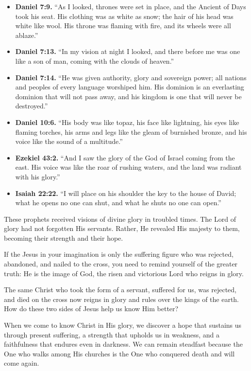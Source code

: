 \begin{itemize}
    \item \textbf{Daniel 7:9.} ``As I looked, thrones were set in place, and the Ancient of Days took his seat. His clothing was as white as snow; the hair of his head was white like wool. His throne was flaming with fire, and its wheels were all ablaze.''  

    \item \textbf{Daniel 7:13.} ``In my vision at night I looked, and there before me was one like a son of man, coming with the clouds of heaven.''  

    \item \textbf{Daniel 7:14.} ``He was given authority, glory and sovereign power; all nations and peoples of every language worshiped him. His dominion is an everlasting dominion that will not pass away, and his kingdom is one that will never be destroyed.''  

    \item \textbf{Daniel 10:6.} ``His body was like topaz, his face like lightning, his eyes like flaming torches, his arms and legs like the gleam of burnished bronze, and his voice like the sound of a multitude.''  

    \item \textbf{Ezekiel 43:2.} ``And I saw the glory of the God of Israel coming from the east. His voice was like the roar of rushing waters, and the land was radiant with his glory.''  

    \item \textbf{Isaiah 22:22.} ``I will place on his shoulder the key to the house of David; what he opens no one can shut, and what he shuts no one can open.''  
\end{itemize}

These prophets received visions of divine glory in troubled times. The Lord of glory had not forgotten His servants. Rather, He revealed His majesty to them, becoming their strength and their hope.

If the Jesus in your imagination is only the suffering figure who was rejected, abandoned, and nailed to the cross, you need to remind yourself of the greater truth: He is the image of God, the risen and victorious Lord who reigns in glory.

\begin{ReaderQuestion}
The same Christ who took the form of a servant, suffered for us, was rejected, and died on the cross now reigns in glory and rules over the kings of the earth. How do these two sides of Jesus help us know Him better?
\end{ReaderQuestion}

When we come to know Christ in His glory, we discover a hope that sustains us through present suffering, a strength that upholds us in weakness, and a faithfulness that endures even in darkness. We can remain steadfast because the One who walks among His churches is the One who conquered death and will come again.

